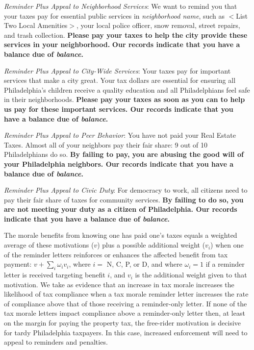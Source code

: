 \documentclass[12pt]{article}
\begin{document}
\bigskip

\noindent \textit{Reminder Plus Appeal to Neighborhood Services}: We
want to remind you that your taxes pay for essential public services
in \textit{neighborhood name}, such as $<$List Two Local Amenities$>$,
your local police officer, snow removal, street repairs, and trash
collection.  \textbf{Please pay your taxes to help the city provide
  these services in your neighborhood.} \textbf{Our records indicate
  that you have a balance due of \textit{balance}.}

\bigskip

\noindent \textit{Reminder Plus Appeal to City-Wide Services}: Your
taxes pay for important services that make a city great. Your tax
dollars are essential for ensuring all Philadelphia's children receive
a quality education and all Philadelphians feel safe in their
neighborhoods.  \textbf{Please pay your taxes as soon as you can to
  help us pay for these important services.  Our records indicate that
  you have a balance due of \textit{balance}.}

\bigskip

\noindent \textit{Reminder Plus Appeal to Peer Behavior}: You have not
paid your Real Estate Taxes.  Almost all of your neighbors pay their
fair share: 9 out of 10 Philadelphians do so.  \textbf{By failing to
  pay, you are abusing the good will of your Philadelphia neighbors.
  Our records indicate that you have a balance due of
  \textit{balance}.}

\bigskip

\noindent \textit{Reminder Plus Appeal to Civic Duty}: For democracy
to work, all citizens need to pay their fair share of taxes for
community services.  \textbf{By failing to do so, you are not meeting
  your duty as a citizen of Philadelphia.  Our records indicate that
  you have a balance due of \textit{balance}.}

\bigskip

The morale benefits from knowing one has paid one's taxes equals a
weighted average of these motivations ($v$) plus a possible additional
weight ($v_{i}$) when one of the reminder letters reinforces or
enhances the affected benefit from tax payment: $v + \sum_{i}
\omega_{i} v_{i}$, where $i =$ N, C, P, or D, and where $\omega_{i} =
1$ if a reminder letter is received targeting benefit $i$, and $v_{i}$
is the additional weight given to that motivation. We take as evidence
that an increase in tax morale increases the likelihood of tax
compliance when a tax morale reminder letter increases the rate of
compliance above that of those receiving a reminder-only letter.  If
none of the tax morale letters impact compliance above a reminder-only
letter then, at least on the margin for paying the property tax, the
free-rider motivation is decisive for tardy Philadelphia
taxpayers.  In this case, increased enforcement will need to appeal to
reminders and penalties.
\end{document}
